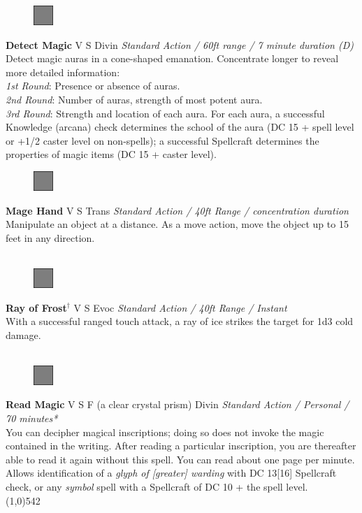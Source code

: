 \documentclass[letterpaper]{article}
\newcommand{\fullline}{\noindent\line(1,0){542} \\}
\newcommand{\e}[1]{\emph{#1}}
\newcommand{\B}[1]{\textbf{#1}}
\newcommand{\spell}[7]{
\begin{figure}
\vspace{-13pt}
\ifstrequal{#2}{Full}{  \includegraphics[width=2em]{Checkbox-Full}}{
\ifstrequal{#2}{Scroll}{\includegraphics[width=2em]{Checkbox-S}}{
                        \includegraphics[width=2em]{Checkbox}}}
\ifstrequal{#7}{}{\vspace{-1em}}{\vspace{#7}}
\end{figure}
\noindent \B{#1} #3 {
    \ifstrequal{#4}{Conj}{\color{Plum}Conj}{%
    \ifstrequal{#4}{Divin}{\color{YellowOrange}Divin}{%
    \ifstrequal{#4}{Ench}{\color{VioletRed}Ench}{%
    \ifstrequal{#4}{Trans}{\color{LimeGreen}Trans}{%
    \ifstrequal{#4}{Evoc}{\color{RedOrange}Evoc}{%
    \ifstrequal{#4}{Illu}{\color{ProcessBlue}Illu}{%
    \ifstrequal{#4}{Abjur}{\color{CadetBlue}Abjur}{%
    \ifstrequal{#4}{Necro}{\color{Red}Necro}{%
}}}}}}}}}
{\footnotesize \e{#5}} \\
#6
}
\begin{document}

\spell{Detect Magic}{Full}{V S}{Divin}{Standard Action / 60ft range / 7 minute duration (D)}{
Detect magic auras in a cone-shaped emanation.  Concentrate longer to reveal more detailed information:\\
\e{1st Round}: Presence or absence of auras.\\
\e{2nd Round}: Number of auras, strength of most potent aura.\\
\e{3rd Round}: Strength and location of each aura.  For each aura, a successful Knowledge (arcana) check determines the school of the aura (DC 15 + spell level or +1/2 caster level on non-spells); a successful Spellcraft determines the properties of magic items (DC 15 + caster level).}{3em} %



\spell{Mage Hand}{Full}{V S}{Trans}{Standard Action / 40ft Range / concentration duration}{%
Manipulate an object at a distance. As a move action, move the object up to 15 feet in any direction.\\}{}\\[-2em] %

\spell{Ray of Frost$^\dag$}{Full}{V S}{Evoc}{Standard Action / 40ft Range / Instant}{
With a successful ranged touch attack, a ray of ice strikes the target for 1d3 cold damage.\\}{}\\[-2em] %

\spell{Read Magic}{Full}{V S F (a clear crystal prism)}{Divin}{Standard Action / Personal / 70 minutes*}{
You can decipher magical inscriptions; doing so does not invoke the magic contained in the writing.  After reading a particular inscription, you are thereafter able to read it again without this spell.  You can read about one page per minute. Allows identification of a \e{glyph of [greater] warding} with DC 13[16] Spellcraft check, or any \e{symbol} spell with a Spellcraft of DC 10 + the spell level.}{1em}\\[-2em] %

\fullline
\vspace{-1.25em}
\end{document}
